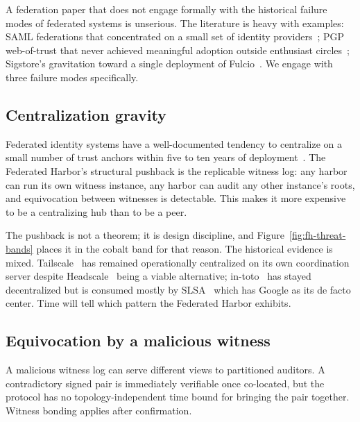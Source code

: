 \documentclass[11pt,a4paper]{article}
\theoremstyle{definition}
\theoremstyle{remark}
\begin{document}
A federation paper that does not engage formally with the historical failure modes of federated systems is unserious. The literature is heavy with examples: SAML federations that concentrated on a small set of identity providers~; PGP web-of-trust that never achieved meaningful adoption outside enthusiast circles~; Sigstore's gravitation toward a single deployment of Fulcio~. We engage with three failure modes specifically.

\subsection{Centralization gravity}\label{sec:fh-centralization}

Federated identity systems have a well-documented tendency to centralize on a small number of trust anchors within five to ten years of deployment~. The Federated Harbor's structural pushback is the replicable witness log: any harbor can run its own witness instance, any harbor can audit any other instance's roots, and equivocation between witnesses is detectable. This makes it more expensive to be a centralizing hub than to be a peer.

The pushback is not a theorem; it is design discipline, and Figure~\ref{fig:fh-threat-bands} places it in the cobalt band for that reason. The historical evidence is mixed. Tailscale~ has remained operationally centralized on its own coordination server despite Headscale~ being a viable alternative; in-toto~ has stayed decentralized but is consumed mostly by SLSA~ which has Google as its de facto center. Time will tell which pattern the Federated Harbor exhibits.

\pagebreak[4]
\subsection{Equivocation by a malicious witness}\label{sec:fh-equiv}

\ifpdmargincolumn\pdequivocationsketch\fi
A malicious witness log can serve different views to partitioned auditors. A contradictory signed pair is immediately verifiable once co-located, but the protocol has no topology-independent time bound for bringing the pair together. Witness bonding applies after confirmation.
\end{document}

